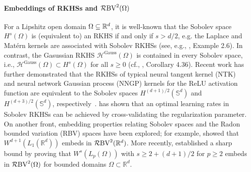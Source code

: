 \paragraph{Embeddings of RKHSs and $\mathcal{R}\mathrm{BV}^2({\Omega})$} 
For a Lipshitz open domain $\Omega \subseteq \mathbb{R}^d$, it is well-known that the Sobolev space \( H^s(\Omega) \) is (equivalent to) an RKHS if and only if \( s > d/2 \), e.g. the Laplace and Matérn kernels are associated with Sobolev RKHSs (see, e.g., \cite{kanagawa2018gaussianprocesseskernelmethods}, Example 2.6). In contrast, the Gasussian RKHS \( \mathcal{H}^{\text{Gauss}}(\Omega) \) is contained in every Sobolev space, i.e., \( \mathcal{H}^{\text{Gauss}}(\Omega) \subset H^s(\Omega) \) for all \( s \geq 0 \) (cf., \cite{steinwart_svm}, Corollary 4.36). %
Recent work has further demonstrated that the RKHSs of typical neural tangent kernel (NTK) and neural network Gaussian process (NNGP) kernels for the ReLU activation function are equivalent to the Sobolev spaces \( H^{(d+1)/2}(\mathbb{S}^d) \) and \( H^{(d+3)/2}(\mathbb{S}^d) \), respectively~\citep{bietti2021deep,chen2021deep}. \cite{Steinwart2009OptimalRF} has shown that an optimal learning rates in Sobolev RKHSs can be achieved by cross-validating the regularization parameter. On another front, embedding properties relating Sobolev spaces and the Radon bounded variation (RBV) spaces have been explored; for example, \cite{Ongie2020A} showed that \( W^{d+1}(L_1(\mathbb{R}^d)) \) embeds in \( \mathcal{R}\mathrm{BV}^2({\mathbb{R}^d}) \). More recently, \cite{mao2024approximationratesshallowreluk} established a sharp bound by proving that \( W^s(L_p(\Omega)) \) with \( s \geq 2 + (d+1)/2 \) for $p \ge 2$ embeds in \( \mathcal{R}\mathrm{BV}^2({\Omega}) \) for bounded domains \( \Omega \subset \mathbb{R}^d \). %
